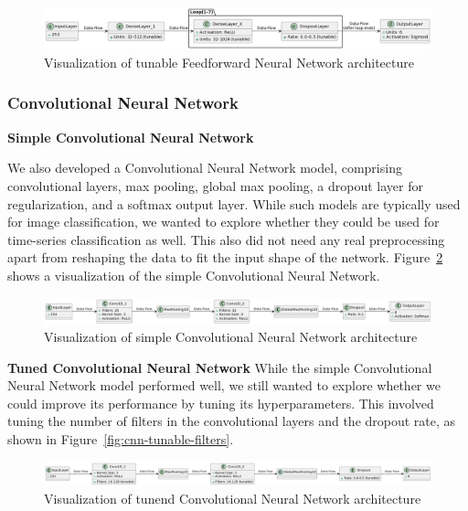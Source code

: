 \begin{figure}[ht]
    \centering
    \includegraphics[width=\textwidth]{./img/ffnn/tuned/fnn-tunable-neurons}
    \caption{Visualization of tunable Feedforward Neural Network architecture}
    \label{fig:fnn-tunable-neurons}
\end{figure}

\subsubsection{Convolutional Neural Network}

\textbf{Simple Convolutional Neural Network}

We also developed a Convolutional Neural Network model, comprising convolutional layers, max pooling, global max pooling, a dropout layer for regularization, and a softmax output layer.
While such models are typically used for image classification, we wanted to explore whether they could be used for time-series classification as well.
This also did not need any real preprocessing apart from reshaping the data to fit the input shape of the network.
Figure~\ref{fig:cnn-simple-architecture} shows a visualization of the simple Convolutional Neural Network.

\begin{figure}[ht]
    \centering
    \includegraphics[width=\textwidth]{./img/cnn/simple/cnn-simple-architecture}
    \caption{Visualization of simple Convolutional Neural Network architecture}
    \label{fig:cnn-simple-architecture}
\end{figure}

\textbf{Tuned Convolutional Neural Network}
While the simple Convolutional Neural Network model performed well, we still wanted to explore whether we could improve its performance by tuning its hyperparameters.
This involved tuning the number of filters in the convolutional layers and the dropout rate, as shown in Figure~\ref{fig:cnn-tunable-filters}.

\begin{figure}[ht]
    \centering
    \includegraphics[width=\textwidth]{./img/cnn/tuned/cnn-architecture}
    \caption{Visualization of tunend Convolutional Neural Network architecture}
    \label{fig:cnn-tunable-architecture}
\end{figure}

